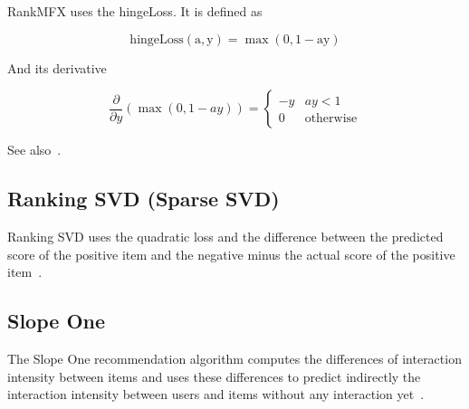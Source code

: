 RankMFX uses the hingeLoss. It is defined as

\[
\mathrm{\textrm{hingeLoss}(a,y)=\max(0,1-ay)}
\]


And its derivative

\[
\frac{\partial}{\partial y}(\max(0,1-ay))=\begin{cases}
-y & ay<1\\
0 & \textrm{otherwise}
\end{cases}
\]


See also~\cite{diaz2012happening}.


\subsection{Ranking SVD (Sparse SVD)}

Ranking SVD uses the quadratic loss and the difference between the
predicted score of the positive item and the negative minus the actual
score of the positive item~\cite{jahrer2011collaborative}.

\subsection{Slope One}

The Slope One recommendation algorithm computes the differences of
interaction intensity between items and uses these differences to 
predict indirectly the interaction intensity between users and items
without any interaction yet~\cite{DBLP:journals/corr/abs-cs-0702144}.
